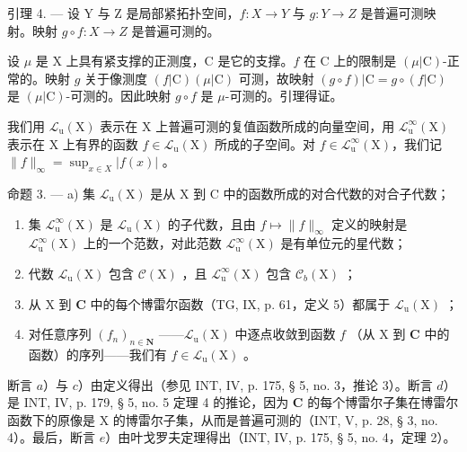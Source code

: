 引理 4. --- 设 Y 与 Z 是局部紧拓扑空间，\(f\colon X\to Y\) 与 \(g\colon Y\to Z\) 是普遍可测映射。映射 \(g\circ f\colon X\to Z\) 是普遍可测的。

设 \(\mu\) 是 X 上具有紧支撑的正测度，C 是它的支撑。\(f\) 在 C 上的限制是 \((\mu|\mathrm{C})\)-正常的。映射 \(g\) 关于像测度 \((f|\mathrm{C})(\mu|\mathrm{C})\) 可测，故映射 \((g \circ f)|\mathrm{C} = g \circ (f|\mathrm{C})\) 是 \((\mu|\mathrm{C})\)-可测的。因此映射 \(g \circ f\) 是 \(\mu\)-可测的。引理得证。

我们用 \(\mathcal{L}_{\mathrm{u}}(\mathrm{X})\) 表示在 X 上普遍可测的复值函数所成的向量空间，用 \(\mathcal{L}_{\mathrm{u}}^{\infty}(\mathrm{X})\) 表示在 X 上有界的函数 \(f \in \mathcal{L}_{\mathrm{u}}(\mathrm{X})\) 所成的子空间。对 \(f \in \mathcal{L}_{\mathrm{u}}^{\infty}(\mathrm{X})\)，我们记 \(\|f\|_{\infty} = \sup_{x \in X} |f(x)|\) 。

命题 3. --- a) 集 \(\mathcal{L}_{\mathrm{u}}(\mathrm{X})\) 是从 X 到 C 中的函数所成的对合代数的对合子代数；

\begin{enumerate}
\def\labelenumi{\alph{enumi})}
\setcounter{enumi}{1}
\item
  集 \(\mathcal{L}_{\mathrm{u}}^{\infty}(\mathrm{X})\) 是 \(\mathcal{L}_{\mathrm{u}}(\mathrm{X})\) 的子代数，且由 \(f\mapsto \| f\|_{\infty}\) 定义的映射是 \(\mathcal{L}_{\mathrm{u}}^{\infty}(\mathrm{X})\) 上的一个范数，对此范数 \(\mathcal{L}_{\mathrm{u}}^{\infty}(\mathrm{X})\) 是有单位元的星代数；
\item
  代数 \(\mathcal{L}_{\mathrm{u}}(\mathrm{X})\) 包含 \(\mathcal{C}(\mathrm{X})\) ，且 \(\mathcal{L}_{\mathrm{u}}^{\infty}(\mathrm{X})\) 包含 \(\mathcal{C}_b(\mathrm{X})\) ；
\item
  从 X 到 \(\mathbf{C}\) 中的每个博雷尔函数（TG, IX, p. 61，定义 5）都属于 \(\mathcal{L}_{\mathrm{u}}(\mathrm{X})\) ；
\item
  对任意序列 \((f_n)_{n\in \mathbf{N}}\) ——\(\mathcal{L}_{\mathrm{u}}(\mathrm{X})\) 中逐点收敛到函数 \(f\) （从 X 到 \(\mathbf{C}\) 中的函数）的序列——我们有 \(f\in \mathcal{L}_{\mathrm{u}}(\mathrm{X})\) 。
\end{enumerate}

断言 \(a\)）与 \(c\)）由定义得出（参见 INT, IV, p. 175, § 5, no. 3，推论 3）。断言 \(d\)）是 INT, IV, p. 179, § 5, no. 5 定理 4 的推论，因为 \(\mathbf{C}\) 的每个博雷尔子集在博雷尔函数下的原像是 X 的博雷尔子集，从而是普遍可测的（INT, V, p. 28, § 3, no. 4）。最后，断言 \(e\)）由叶戈罗夫定理得出（INT, IV, p. 175, § 5, no. 4，定理 2）。

